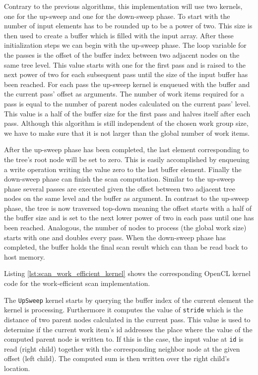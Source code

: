 Contrary to the previous algorithms, this implementation will use two kernels, one for the up-sweep and one for the down-sweep phase. 
To start with the number of input elements has to be rounded up to be a power of two. This size is then used to create a buffer which is filled with the input array.
After these initialization steps we can begin with the up-sweep phase. The loop variable for the passes is the offset of the buffer index between two adjacent nodes on the same tree level. This value starts with one for the first pass and is raised to the next power of two for each subsequent pass until the size of the input buffer has been reached. For each pass the up-sweep kernel is enqueued with the buffer and the current pass' offset as arguments. The number of work items required for a pass is equal to the number of parent nodes calculated on the current pass' level. This value is a half of the buffer size for the first pass and halves itself after each pass. Although this algorithm is still independent of the chosen work group size, we have to make sure that it is not larger than the global number of work items.

After the up-sweep phase has been completed, the last element corresponding to the tree's root node will be set to zero. This is easily accomplished by enqueuing a write operation writing the value zero to the last buffer element.
Finally the down-sweep phase can finish the scan computation. Similar to the up-sweep phase several passes are executed given the offset between two adjacent tree nodes on the same level and the buffer as argument. In contrast to the up-sweep phase, the tree is now traversed top-down meaning the offset starts with a half of the buffer size and is set to the next lower power of two in each pass until one has been reached. Analogous, the number of nodes to process (the global work size) starts with one and doubles every pass.
When the down-sweep phase has completed, the buffer holds the final scan result which can than be read back to host memory.

Listing \ref{lst:scan_work_efficient_kernel} shows the corresponding OpenCL kernel code for the work-efficient scan implementation.



The \lstinline!UpSweep! kernel starts by querying the buffer index of the current element the kernel is processing. Furthermore it computes the value of \lstinline!stride! which is the distance of two parent nodes calculated in the current pass. This value is used to determine if the current work item's id addresses the place where the value of the computed parent node is written to. If this is the case, the input value at \lstinline!id! is read (right child) together with the corresponding neighbor node at the given offset (left child). The computed sum is then written over the right child's location.

